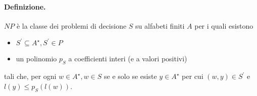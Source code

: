 \paragraph{Definizione.} $N P$ è la classe dei problemi di decisione $S$ su
alfabeti finiti $A$ per i quali esistono

\begin{itemize}
    \item $S^{\prime} \subseteq A^{\star}, S^{\prime} \in P$
    \item un polinomio $p_S$ a coefficienti interi (e a valori positivi)
\end{itemize}

tali che, per ogni $w \in A^{\star}, w \in S$ se e solo se esiste $y \in
    A^{\star}$ per cui $(w, y) \in S^{\prime}$ e $l(y) \leq p_S(l(w))$.

